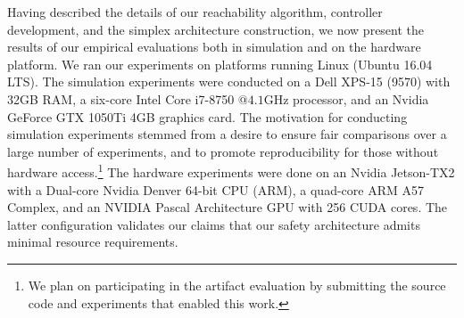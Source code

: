 \documentclass[manuscript,screen,review]{acmart}
\begin{document}




Having described the details of our reachability algorithm, controller development, and the simplex architecture construction, we now present the results of our empirical evaluations both in simulation and on the hardware platform. We ran our experiments on platforms running Linux (Ubuntu 16.04 LTS). The simulation experiments were conducted on a Dell XPS-15 (9570) with 32GB RAM, a six-core Intel Core i7-8750 $@ 4.1\textrm{GHz}$ processor, and an Nvidia GeForce GTX 1050Ti 4GB graphics card. The motivation for conducting simulation experiments stemmed from a desire to ensure fair comparisons over a large number of experiments, and to promote reproducibility for those without hardware access.\footnote{We plan on participating in the artifact evaluation by submitting the source code and experiments that enabled this work.} The hardware experiments were done on an Nvidia Jetson-TX2 with a Dual-core Nvidia Denver 64-bit CPU (ARM), a quad-core ARM A57 Complex, and an NVIDIA Pascal Architecture GPU with 256 CUDA cores. The latter configuration validates our claims that our safety architecture admits minimal resource requirements. 
\end{document}
